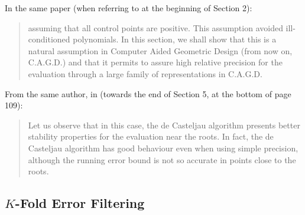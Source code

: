 \documentclass[letterpaper,10pt]{article}
\begin{document}
\noindent In the same paper (when referring to \cite{Bezerra2013} at the
beginning of Section 2):

\begin{quote}
  assuming that all control points are positive. This assumption avoided
  ill-conditioned polynomials. In this section, we shall show that this is
  a natural assumption in Computer Aided Geometric Design (from now on,
  C.A.G.D.) and that it permits to assure high relative precision for the
  evaluation through a large family of representations in C.A.G.D.
\end{quote}

\noindent From the same author, in \cite{Mainar2005} (towards the
end of Section 5, at the bottom of page 109):

\begin{quote}
  Let us observe that in this case, the de Casteljau algorithm presents
  better stability properties for the evaluation near the roots. In fact,
  the de Casteljau algorithm has good behaviour even when using simple
  precision, although the running error bound is not so accurate in points
  close to the roots.
\end{quote}

\subsection{\texorpdfstring{\(K\)}{K}-Fold Error Filtering}
\end{document}

